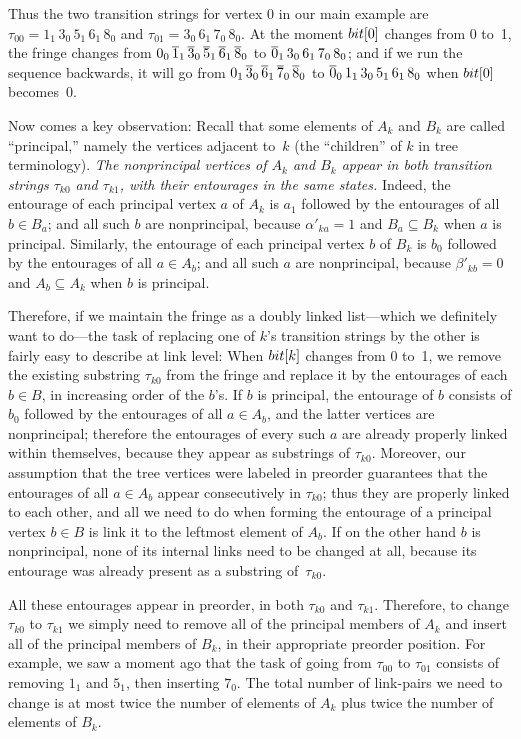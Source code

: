Thus the two transition strings for vertex 0 in our main example are
$\tau_{00}=1_1\,3_0\,5_1\,6_1\,8_0$ and $\tau_{01}=3_0\,6_1\,7_0\,8_0$.
At the moment $\\{bit}[0]$ changes from 0 to~1, the fringe changes from
$0_0\,\overline1_1\,\overline3_0\,\overline5_1\,\overline6_1\,\overline8_0$ to $\overline0_1\,3_0\,6_1\,7_0\,8_0$;
and if we run the sequence backwards, it will go from
$0_1\,\overline3_0\,\overline6_1\,\overline7_0\,\overline8_0$ to $\overline0_0\,1_1\,3_0\,5_1\,6_1\,8_0$
when $\\{bit}[0]$ becomes~0.

\fi

Now comes a key observation: Recall that some elements of $A_k$ and $B_k$
are called ``principal,'' namely the vertices adjacent to~$k$ (the
``children'' of $k$ in tree terminology). {\sl The nonprincipal vertices of
$A_k$ and $B_k$ appear in both transition strings $\tau_{k0}$ and $\tau_{k1}$,
with their entourages in the same states.} Indeed, the entourage
of each principal vertex $a$ of $A_k$ is $a_1$ followed by the
entourages of all $b\in B_a$; and all such $b$ are nonprincipal,
because $\alpha'_{ka}=1$ and $B_a\subseteq B_k$ when $a$ is principal.
Similarly, the entourage
of each principal vertex $b$ of $B_k$ is $b_0$ followed by the
entourages of all $a\in A_b$; and all such $a$ are nonprincipal,
because $\beta'_{kb}=0$ and $A_b\subseteq A_k$ when $b$ is principal.

Therefore, if we maintain the fringe as a doubly linked list---which we
definitely want to do---the task of replacing one of $k$'s transition strings
by the other is fairly easy to describe at link level: When $\\{bit}[k]$ changes
from 0 to~1, we remove the existing substring $\tau_{k0}$ from the fringe
and replace it by the entourages of each $b\in B$, in increasing order
of the $b$'s. If $b$ is principal, the entourage of $b$ consists of
$b_0$ followed by the entourages of all $a\in A_b$, and the latter vertices
are nonprincipal; therefore the entourages of every such $a$ are already
properly linked within themselves, because they appear as substrings of
$\tau_{k0}$. Moreover, our assumption that the tree vertices were
labeled in preorder guarantees that the entourages of all $a\in A_b$
appear consecutively in\/ $\tau_{k0}$; thus they are properly linked
to each other, and all we need to do when forming the entourage of a
principal vertex $b\in B$ is link it to the leftmost element of $A_b$.
If on the other hand $b$ is nonprincipal, none of its internal links
need to be changed at all, because its entourage was already present
as a substring of~$\tau_{k0}$.

All these entourages appear in preorder, in both $\tau_{k0}$ and $\tau_{k1}$.
Therefore, to change $\tau_{k0}$ to $\tau_{k1}$ we simply need to
remove all of the principal members of $A_k$ and insert all of the
principal members of $B_k$, in their appropriate preorder position.
For example, we saw a moment ago that the task of
going from $\tau_{00}$ to $\tau_{01}$ consists of
removing $1_1$ and $5_1$, then inserting $7_0$.
The total number of link-pairs we need to change is at most
twice the number of elements of $A_k$ plus twice the number of
elements of $B_k$.


